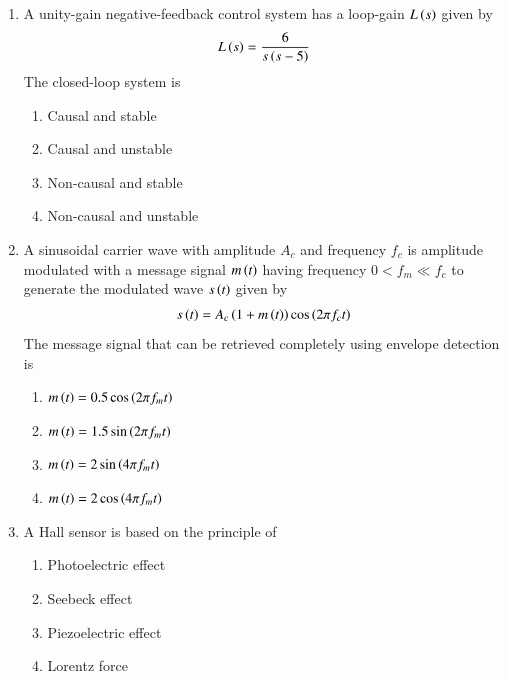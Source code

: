 \documentclass[journal,12pt,onecolumn]{IEEEtran}
\theoremstyle{remark}
\begin{document}
\begin{enumerate}
\item A unity-gain negative-feedback control system has a loop-gain $L\left(s\right)$ given by
\begin{align*}
L\left(s\right) = \frac{6}{s\left(s-5\right)}
\end{align*}
The closed-loop system is \underline{\hspace{2cm}}

\hfill{}
\begin{enumerate}
\item Causal and stable
\item Causal and unstable
\item Non-causal and stable
\item Non-causal and unstable
\end{enumerate}

\item A sinusoidal carrier wave with amplitude $A_c$ and frequency $f_c$ is amplitude modulated with a message signal $m\left(t\right)$ having frequency $0 < f_m \ll f_c$ to generate the modulated wave $s\left(t\right)$ given by
\begin{align*}
s\left(t\right) = A_c\left(1 + m\left(t\right)\right)\cos \left(2\pi f_c t\right) 
\end{align*}
The message signal that can be retrieved completely using envelope detection is \underline{\hspace{2cm}}

\hfill{}
\begin{enumerate}
\item $m\left(t\right) = 0.5 \cos\left(2\pi f_m t\right)$
\item $m\left(t\right) = 1.5 \sin\left(2\pi f_m t\right)$
\item $m\left(t\right) = 2 \sin\left(4\pi f_m t\right)$
\item $m\left(t\right) = 2 \cos \left(4\pi f_m t\right)$
\end{enumerate}

\item A Hall sensor is based on the principle of \underline{\hspace{2cm}}

\hfill{}
\begin{enumerate}
\item Photoelectric effect
\item Seebeck effect
\item Piezoelectric effect
\item Lorentz force
\end{enumerate}


\end{enumerate}
\end{document}
